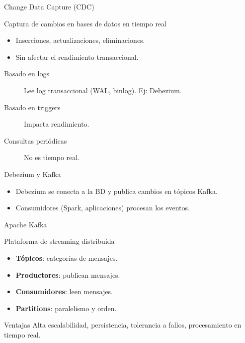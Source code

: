 \documentclass[aspectratio=169, 10pt, xcolor=table]{beamer}
\begin{document}
\begin{frame}{Change Data Capture (CDC)}
    \begin{block}{Captura de cambios en bases de datos en tiempo real}
        \begin{itemize}
            \item Inserciones, actualizaciones, eliminaciones.
            \item Sin afectar el rendimiento transaccional.
        \end{itemize}
    \end{block}
    \begin{description}
        \item[Basado en logs] Lee log transaccional (WAL, binlog). Ej: Debezium.
        \item[Basado en triggers] Impacta rendimiento.
        \item[Consultas periódicas] No es tiempo real.
    \end{description}
\end{frame}

\begin{frame}{Debezium y Kafka}
    \begin{center}
    \end{center}
    \begin{itemize}
        \item Debezium se conecta a la BD y publica cambios en tópicos Kafka.
        \item Consumidores (Spark, aplicaciones) procesan los eventos.
    \end{itemize}
\end{frame}

\begin{frame}{Apache Kafka}
    \begin{block}{Plataforma de streaming distribuida}
        \begin{itemize}
            \item \textbf{Tópicos}: categorías de mensajes.
            \item \textbf{Productores}: publican mensajes.
            \item \textbf{Consumidores}: leen mensajes.
            \item \textbf{Partitions}: paralelismo y orden.
        \end{itemize}
    \end{block}
    \begin{alertblock}{Ventajas}
        Alta escalabilidad, persistencia, tolerancia a fallos, procesamiento en tiempo real.
    \end{alertblock}
\end{frame}
\end{document}
